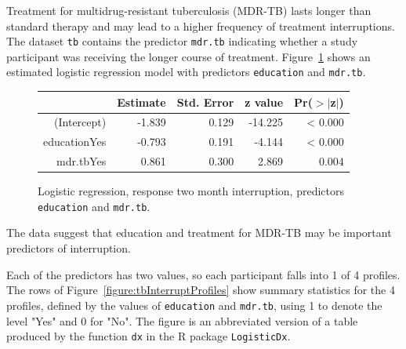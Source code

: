 Treatment for multidrug-resistant tuberculosis (MDR-TB) lasts longer than standard therapy and may lead to a higher frequency of treatment interruptions.  The dataset \texttt{tb} contains the predictor \texttt{mdr.tb} indicating whether a study participant was receiving the longer course of treatment.  Figure~\ref{treatmentInterruptEducMdrLogreg} shows an estimated logistic regression model with predictors \texttt{education} and \texttt{mdr.tb}.

\begin{figure}[ht]
\centering
\begin{tabular}{rrrrr}
  \hline
 & Estimate & Std. Error & z value & Pr($>$$|$z$|$) \\
  \hline
(Intercept) & -1.839 & 0.129 & -14.225 & < 0.000 \\
  educationYes & -0.793 & 0.191 & -4.144 & < 0.000 \\
  mdr.tbYes & 0.861 & 0.300 & 2.869 & 0.004 \\
   \hline
\end{tabular}
\caption{Logistic regression, response two month interruption,
       predictors \texttt{education} and \texttt{mdr.tb}.}
\label{treatmentInterruptEducMdrLogreg}
\end{figure}
The data suggest that education and treatment for MDR-TB may be important predictors of interruption.

Each of the predictors has two values, so each participant falls into 1 of 4 profiles.  The rows of Figure~\ref{figure:tbInterruptProfiles} show summary statistics for the 4 profiles, defined by the values of \texttt{education} and \texttt{mdr.tb}, using 1 to denote the level "Yes" and 0 for "No".  The figure is an abbreviated version of a table produced by the function \texttt{dx} in the \textsf{R} package \texttt{LogisticDx}.

